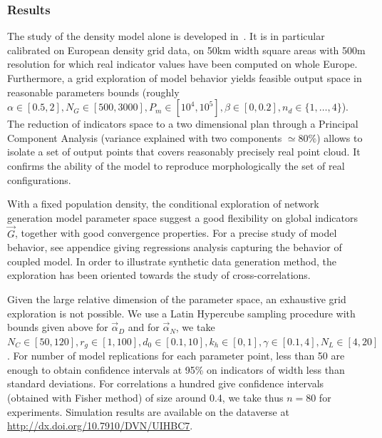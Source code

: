 \documentclass{bmcart}
\begin{document}
\subsubsection*{Results}

The study of the density model alone is developed in~\cite{raimbault2018calibration}. It is in particular calibrated on European density grid data, on 50km width square areas with 500m resolution for which real indicator values have been computed on whole Europe. Furthermore, a grid exploration of model behavior yields feasible output space in reasonable parameters bounds (roughly $\alpha \in [0.5,2],N_G\in [500,3000], P_m \in [10^4,10^5],\beta\in [0,0.2], n_d \in \{ 1, \ldots , 4\}$). The reduction of indicators space to a two dimensional plan through a Principal Component Analysis (variance explained with two components $\simeq 80\%$) allows to isolate a set of output points that covers reasonably precisely real point cloud. It confirms the ability of the model to reproduce morphologically the set of real configurations.



With a fixed population density, the conditional exploration of network generation model parameter space suggest a good flexibility on global indicators $\vec{G}$, together with good convergence properties. For a precise study of model behavior, see appendice giving regressions analysis capturing the behavior of coupled model. In order to illustrate synthetic data generation method, the exploration has been oriented towards the study of cross-correlations.



Given the large relative dimension of the parameter space, an exhaustive grid exploration is not possible. We use a Latin Hypercube sampling procedure with bounds given above for $\vec{\alpha}_D$ and for $\vec{\alpha}_N$, we take $N_C \in [50,120], r_g \in [1,100] , d_0 \in [0.1,10] , k_h \in [0,1] , \gamma \in [0.1,4],N_L\in [4,20]$. For number of model replications for each parameter point, less than 50 are enough to obtain confidence intervals at 95\% on indicators of width less than standard deviations. For correlations a hundred give confidence intervals (obtained with Fisher method) of size around 0.4, we take thus $n=80$ for experiments. Simulation results are available on the dataverse at \url{http://dx.doi.org/10.7910/DVN/UIHBC7}.
\end{document}
